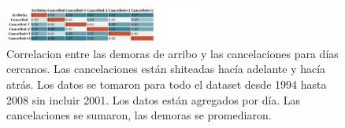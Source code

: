 \begin{figure}[h]
  \includegraphics[width=0.6\textwidth, height=0.24\textheight]{./img/daily-full-csv-correlation-table.jpg}
  \centering
  \caption{ Correlacion entre las demoras de arribo y las
    cancelaciones para días cercanos. Las cancelaciones están
    shiteadas hacía adelante y hacía atrás. Los datos se tomaron para
    todo el dataset desde 1994 hasta 2008 sin incluir 2001. Los datos
    están agregados por día. Las cancelaciones se sumaron, las demoras
    se promediaron.  }
  \label{fig:cancell-arrdelay}
\end{figure}